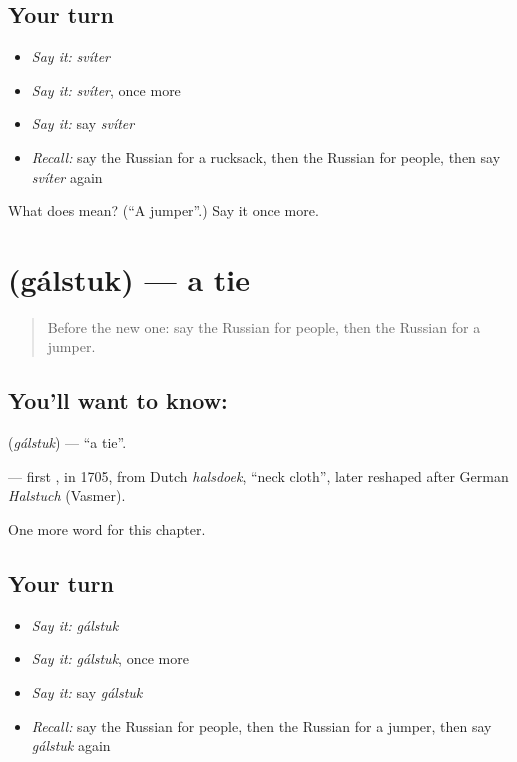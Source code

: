 \subsection*{Your turn}
\begin{itemize}
\raggedright
  \item \emph{Say it:} \emph{svíter}
  \item \emph{Say it:} \emph{svíter}, once more
  \item \emph{Say it:} say \emph{svíter}
  \item \emph{Recall:} say the Russian for a rucksack, then the Russian for people, then say \emph{svíter} again
\end{itemize}

\begin{tcolorbox}[breakable,colback=teal!4,colframe=teal!35!black,title={Before you move on}]
What does  mean? (\textquotedblleft{}A jumper\textquotedblright{}.) Say it once more.
\end{tcolorbox}
\section[\texorpdfstring{\ru{галстук} (gálstuk)}{галстук (gálstuk)}]{ (gálstuk) — a tie}

\label{lesson:RU-C101-tie}



\begin{quote}
Before the new one: say the Russian for people, then the Russian for a jumper.
\end{quote}

\subsection*{You'll want to know: }
\textbf{} (\emph{gálstuk}) — \textquotedblleft{}a tie\textquotedblright{}.

\begin{cousinweb}
\textbf{} — first \emph{}, in 1705, from Dutch \emph{halsdoek}, \textquotedblleft{}neck cloth\textquotedblright{}, later reshaped after German \emph{Halstuch} (Vasmer).
\end{cousinweb}

\begin{grammarlens}[title={What you've built}]
One more word for this chapter.
\end{grammarlens}

\subsection*{Your turn}
\begin{itemize}
\raggedright
  \item \emph{Say it:} \emph{gálstuk}
  \item \emph{Say it:} \emph{gálstuk}, once more
  \item \emph{Say it:} say \emph{gálstuk}
  \item \emph{Recall:} say the Russian for people, then the Russian for a jumper, then say \emph{gálstuk} again
\end{itemize}

